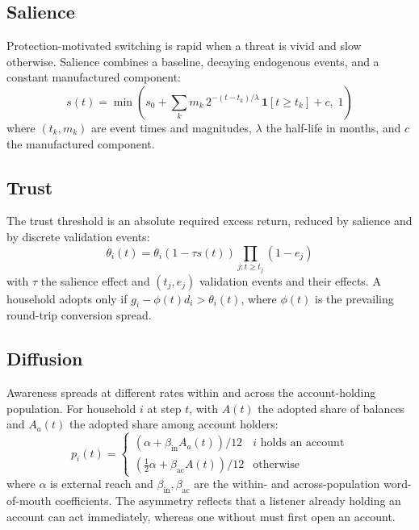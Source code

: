 \documentclass[11pt,a4paper]{article}
\begin{document}
\subsection{Salience}

Protection-motivated switching is rapid when a threat is vivid and slow
otherwise. Salience combines a baseline, decaying endogenous events, and a
constant manufactured component:
\begin{equation}
s(t) = \min\!\left(s_0 + \sum_{k} m_k \, 2^{-(t - t_k)/\lambda}
\,\mathbf{1}[t \ge t_k] + c,\; 1\right)
\end{equation}
where $(t_k, m_k)$ are event times and magnitudes, $\lambda$ the half-life
in months, and $c$ the manufactured component.

\subsection{Trust}

The trust threshold is an absolute required excess return, reduced by
salience and by discrete validation events:
\begin{equation}
\theta_i(t) = \theta_i \left(1 - \tau s(t)\right)
\prod_{j : t \ge t_j} (1 - e_j)
\end{equation}
with $\tau$ the salience effect and $(t_j, e_j)$ validation events and their
effects. A household adopts only if $g_i - \phi(t) d_i > \theta_i(t)$, where
$\phi(t)$ is the prevailing round-trip conversion spread.

\subsection{Diffusion}

Awareness spreads at different rates within and across the account-holding
population. For household $i$ at step $t$, with $A(t)$ the adopted share of
balances and $A_a(t)$ the adopted share among account holders:
\begin{equation}
p_i(t) =
\begin{cases}
\left(\alpha + \beta_{\text{in}} A_a(t)\right)/12 & \text{$i$ holds an account}\\[3pt]
\left(\tfrac{1}{2}\alpha + \beta_{\text{ac}} A(t)\right)/12 & \text{otherwise}
\end{cases}
\end{equation}
where $\alpha$ is external reach and $\beta_{\text{in}}, \beta_{\text{ac}}$
are the within- and across-population word-of-mouth coefficients. The
asymmetry reflects that a listener already holding an account can act
immediately, whereas one without must first open an account.
\end{document}

